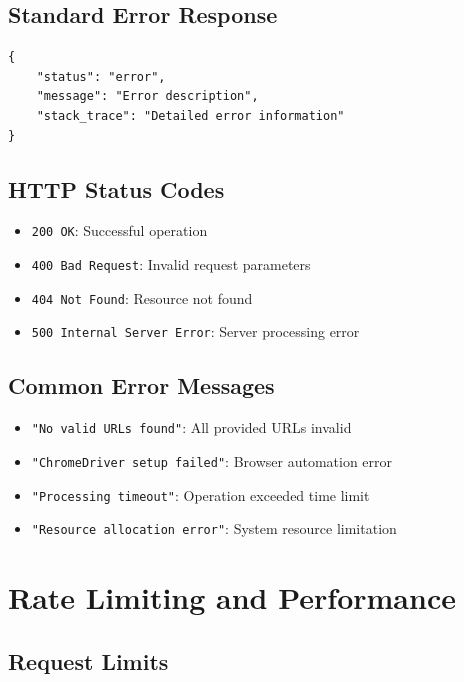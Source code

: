 \subsection{Standard Error Response}
\label{subsec:error-response}

\begin{verbatim}
{
    "status": "error",
    "message": "Error description",
    "stack_trace": "Detailed error information"
}
\end{verbatim}

\subsection{HTTP Status Codes}
\label{subsec:status-codes}

\begin{itemize}
    \item \texttt{200 OK}: Successful operation
    \item \texttt{400 Bad Request}: Invalid request parameters
    \item \texttt{404 Not Found}: Resource not found
    \item \texttt{500 Internal Server Error}: Server processing error
\end{itemize}

\subsection{Common Error Messages}
\label{subsec:error-messages}

\begin{itemize}
    \item \texttt{"No valid URLs found"}: All provided URLs invalid
    \item \texttt{"ChromeDriver setup failed"}: Browser automation error
    \item \texttt{"Processing timeout"}: Operation exceeded time limit
    \item \texttt{"Resource allocation error"}: System resource limitation
\end{itemize}

\section{Rate Limiting and Performance}
\label{sec:rate-limiting}

\subsection{Request Limits}
\label{subsec:request-limits}

